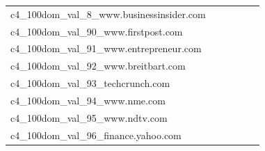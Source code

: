 \documentclass[dvipsnames]{article}
\begin{document}
\begin{appendix}
{\begin{longtable}{m{6cm}m{1.7cm}m{1.7cm}m{1.7cm}m{1.7cm}m{1.7cm}}
	c4\_100dom\_val\_8\_www.businessinsider.com  & \colorbox[HTML]{fefee3}{\makebox[\mywidth][c]{10.97}} & \colorbox[HTML]{f7fcbe}{\makebox[\mywidth][c]{10.69}} & \colorbox[HTML]{ffffe5}{\makebox[\mywidth][c]{11.35}} & \colorbox[HTML]{b8e293}{\makebox[\mywidth][c]{10.52}} & \colorbox[HTML]{77c578}{\makebox[\mywidth][c]{10.46}}\\
	c4\_100dom\_val\_90\_www.firstpost.com  & \colorbox[HTML]{ffffe5}{\makebox[\mywidth][c]{11.71}} & \colorbox[HTML]{f7fcbb}{\makebox[\mywidth][c]{11.24}} & \colorbox[HTML]{ffffe5}{\makebox[\mywidth][c]{12.08}} & \colorbox[HTML]{dff2a7}{\makebox[\mywidth][c]{11.12}} & \colorbox[HTML]{77c578}{\makebox[\mywidth][c]{10.96}}\\
	c4\_100dom\_val\_91\_www.entrepreneur.com  & \colorbox[HTML]{fefee0}{\makebox[\mywidth][c]{13.10}} & \colorbox[HTML]{d7efa2}{\makebox[\mywidth][c]{12.68}} & \colorbox[HTML]{ffffe5}{\makebox[\mywidth][c]{13.65}} & \colorbox[HTML]{e3f4aa}{\makebox[\mywidth][c]{12.72}} & \colorbox[HTML]{77c578}{\makebox[\mywidth][c]{12.54}}\\
	c4\_100dom\_val\_92\_www.breitbart.com  & \colorbox[HTML]{fefee2}{\makebox[\mywidth][c]{13.47}} & \colorbox[HTML]{b2df90}{\makebox[\mywidth][c]{12.67}} & \colorbox[HTML]{ffffe5}{\makebox[\mywidth][c]{14.29}} & \colorbox[HTML]{e5f4ab}{\makebox[\mywidth][c]{12.84}} & \colorbox[HTML]{77c578}{\makebox[\mywidth][c]{12.56}}\\
	c4\_100dom\_val\_93\_techcrunch.com  & \colorbox[HTML]{fcfed7}{\makebox[\mywidth][c]{14.20}} & \colorbox[HTML]{b2df90}{\makebox[\mywidth][c]{13.68}} & \colorbox[HTML]{ffffe5}{\makebox[\mywidth][c]{15.18}} & \colorbox[HTML]{e1f3a9}{\makebox[\mywidth][c]{13.82}} & \colorbox[HTML]{77c578}{\makebox[\mywidth][c]{13.58}}\\
	c4\_100dom\_val\_94\_www.nme.com  & \colorbox[HTML]{fefee0}{\makebox[\mywidth][c]{14.12}} & \colorbox[HTML]{bee496}{\makebox[\mywidth][c]{13.28}} & \colorbox[HTML]{ffffe5}{\makebox[\mywidth][c]{15.06}} & \colorbox[HTML]{e4f4ab}{\makebox[\mywidth][c]{13.43}} & \colorbox[HTML]{77c578}{\makebox[\mywidth][c]{13.12}}\\
	c4\_100dom\_val\_95\_www.ndtv.com  & \colorbox[HTML]{ffffe5}{\makebox[\mywidth][c]{10.66}} & \colorbox[HTML]{f9fcc6}{\makebox[\mywidth][c]{10.26}} & \colorbox[HTML]{ffffe5}{\makebox[\mywidth][c]{10.90}} & \colorbox[HTML]{d0ec9e}{\makebox[\mywidth][c]{10.10}} & \colorbox[HTML]{77c578}{\makebox[\mywidth][c]{10.00}}\\
	c4\_100dom\_val\_96\_finance.yahoo.com  & \colorbox[HTML]{ffffe5}{\makebox[\mywidth][c]{9.96}} & \colorbox[HTML]{f7fcba}{\makebox[\mywidth][c]{9.55}} & \colorbox[HTML]{ffffe5}{\makebox[\mywidth][c]{10.22}} & \colorbox[HTML]{cae99c}{\makebox[\mywidth][c]{9.43}} & \colorbox[HTML]{77c578}{\makebox[\mywidth][c]{9.34}}\\

\end{longtable}}
\end{appendix}
\end{document}
